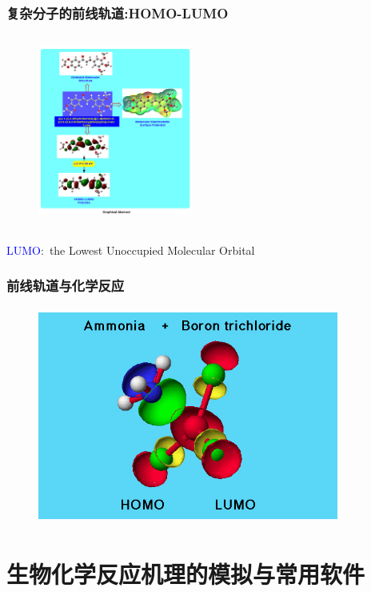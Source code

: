 \frame
{
	\frametitle{复杂分子的前线轨道:\textrm{HOMO-LUMO}}
\begin{figure}[h!]
\centering
\vspace{-10.5pt}
\includegraphics[height=2.50in,width=2.00in,viewport=0 40 750 850,clip]{Figures/HOMO-LUMO.jpg}
\label{HOMO-LUMO:LUMO}
\end{figure}
\textrm{\textcolor{blue}{LUMO}:~the Lowest Unoccupied Molecular Orbital}
}

\frame
{
	\frametitle{前线轨道与化学反应}
\begin{figure}[h!]
\centering
\vspace{-10.5pt}
\includegraphics[height=2.80in,width=3.90in,viewport=0 0 550 400,clip]{Figures/NH3_BCl3_HOMO_LUMO_orient.jpg}
\label{HOMO-LUMO}
\end{figure}
}

\section{生物化学反应机理的模拟与常用软件}
